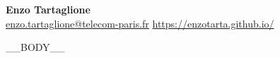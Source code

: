\documentclass[11pt,a4paper]{article}
\begin{document}
\begin{center}
{\LARGE\bfseries Enzo Tartaglione}\\[2pt]
\href{mailto:enzo.tartaglione@telecom-paris.fr}{enzo.tartaglione@telecom-paris.fr}\quad
\href{https://enzotarta.github.io/}{https://enzotarta.github.io/}
\end{center}

\vspace{4pt}

__BODY__
\end{document}
